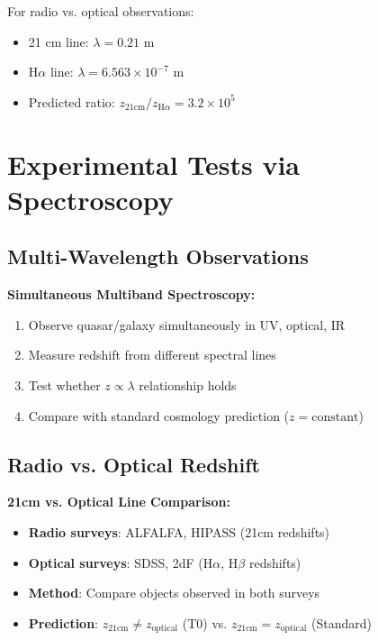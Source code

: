 \documentclass[12pt,a4paper]{article}
\theoremstyle{definition}
\begin{document}
	For radio vs. optical observations:
	\begin{itemize}
		\item 21 cm line: $\lambda = 0.21$ m
		\item H$\alpha$ line: $\lambda = 6.563 \times 10^{-7}$ m
		\item Predicted ratio: $z_{21\text{cm}}/z_{\text{H}\alpha} = 3.2 \times 10^5$
	\end{itemize}
	
	\section{Experimental Tests via Spectroscopy}
	\label{sec:experimental_tests}
	
	\subsection{Multi-Wavelength Observations}
	
	\begin{experiment}
		\textbf{Simultaneous Multiband Spectroscopy:}
		\begin{enumerate}
			\item Observe quasar/galaxy simultaneously in UV, optical, IR
			\item Measure redshift from different spectral lines
			\item Test whether $z \propto \lambda$ relationship holds
			\item Compare with standard cosmology prediction ($z = \text{constant}$)
		\end{enumerate}
	\end{experiment}
	
	\subsection{Radio vs. Optical Redshift}
	
	\begin{experiment}
		\textbf{21cm vs. Optical Line Comparison:}
		\begin{itemize}
			\item \textbf{Radio surveys}: ALFALFA, HIPASS (21cm redshifts)
			\item \textbf{Optical surveys}: SDSS, 2dF (H$\alpha$, H$\beta$ redshifts)
			\item \textbf{Method}: Compare objects observed in both surveys
			\item \textbf{Prediction}: $z_{21\text{cm}} \neq z_{\text{optical}}$ (T0) vs. $z_{21\text{cm}} = z_{\text{optical}}$ (Standard)
		\end{itemize}
	\end{experiment}
	
\end{document}
